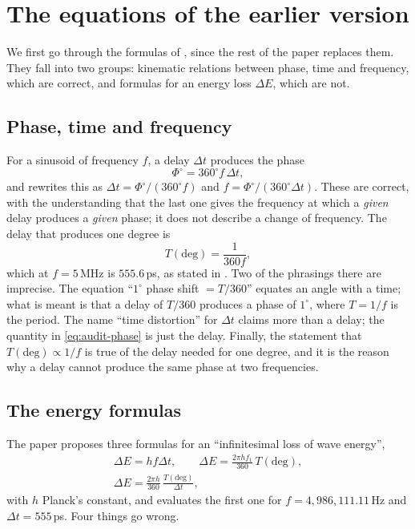 \section{The equations of the earlier version}\label{sec:audit}

We first go through the formulas of \cite{tb23}, since the rest of the paper
replaces them. They fall into two groups: kinematic relations between phase,
time and frequency, which are correct, and formulas for an energy loss
$\Delta E$, which are not.

\subsection{Phase, time and frequency}

For a sinusoid of frequency $f$, a delay $\Delta t$ produces the phase
\begin{equation}\label{eq:audit-phase}
\Phi^\circ=360^\circ f\,\Delta t ,
\end{equation}
and \cite{tb23} rewrites this as $\Delta t=\Phi^\circ/(360^\circ f)$ and
$f=\Phi^\circ/(360^\circ\Delta t)$. These are correct, with the
understanding that the last one gives the frequency at which a \emph{given}
delay produces a \emph{given} phase; it does not describe a change of
frequency. The delay that produces one degree is
\[
T(\mathrm{deg})=\frac{1}{360f},
\]
which at $f=5$\,MHz is $555.6$\,ps, as stated in \cite{tb23}. Two of the
phrasings there are imprecise. The equation ``$1^\circ$ phase
shift $=T/360$'' equates an angle with a time; what is meant is that a delay
of $T/360$ produces a phase of $1^\circ$, where $T=1/f$ is the period. The
name ``time distortion'' for $\Delta t$ claims more than a delay;
the quantity in \eqref{eq:audit-phase} is just the delay. Finally, the
statement that $T(\mathrm{deg})\propto1/f$ is true of the delay needed for one
degree, and it is the reason why a delay cannot produce the same phase at
two frequencies.

\subsection{The energy formulas}

The paper \cite{tb23} proposes three formulas for an ``infinitesimal loss of
wave energy'',
\begin{equation}\label{eq:audit-dE}
\begin{gathered}
\Delta E=hf\Delta t,\qquad
\Delta E=\frac{2\pi hf_1}{360}\,T(\mathrm{deg}),\\
\Delta E=\frac{2\pi h}{360}\,\frac{T(\mathrm{deg})}{\Delta t},
\end{gathered}
\end{equation}
with $h$ Planck's constant, and evaluates the first one for $f=4{,}986{,}111.11$\,Hz and
$\Delta t=555$\,ps. Four things go wrong.

